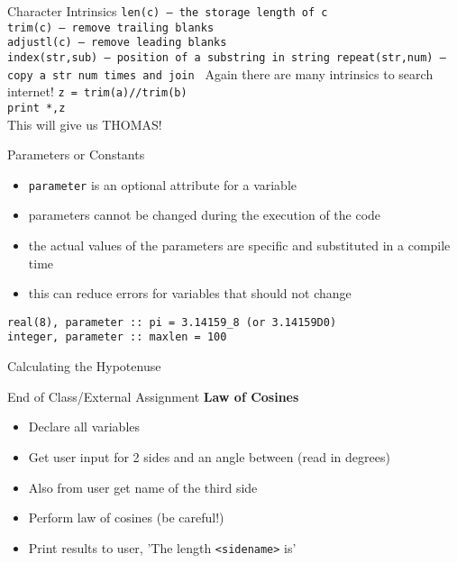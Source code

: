\documentclass{beamer}
\begin{document}
\begin{frame}{Character Intrinsics}
\texttt{len(c) -- the storage length of c\\
  trim(c) -- remove trailing blanks\\
  adjustl(c) -- remove leading blanks\\
  index(str,sub) -- position of a substring in string
  repeat(str,num) -- copy a str num times and join
}
\vfill Again there are many intrinsics to search internet!
\vfill
\texttt{z = trim(a)//trim(b)} \\
\texttt{print *,z} \\
\vfill
This will give us THOMAS!
\end{frame}
\begin{frame}{Parameters or Constants}
  \begin{itemize}
    \item \texttt{parameter} is an optional attribute for a variable
    \vfill\item parameters cannot be changed during the execution of the code
    \vfill\item the actual values of the parameters are specific and substituted in a compile time
    \vfill\item this can reduce errors for variables that should not change
  \end{itemize}
\vfill
\texttt{real(8), parameter :: pi = 3.14159\_8 (or 3.14159D0) \\
	integer, parameter :: maxlen = 100}
\end{frame}
\begin{frame}[allowframebreaks]{Calculating the Hypotenuse}
\begin{scriptsize}
  
\end{scriptsize}
\end{frame}
\begin{frame}{End of Class/External Assignment}
\center\Large\textbf{Law of Cosines}
\normalsize
\begin{itemize}
  \vfill\item Declare all variables
  \vfill\item Get user input for 2 sides and an angle between (read in degrees)
  \vfill\item Also from user get name of the third side
  \vfill\item Perform law of cosines (be careful!)
  \vfill\item Print results to user,  'The length \texttt{<sidename>} is'
\end{itemize}
\end{frame}
\end{document}
